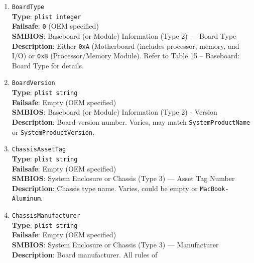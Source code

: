 \documentclass[]{article}
\begin{document}
\begin{enumerate}
  \texttt{BoardSerialNumber}\\
  \textbf{Type}: \texttt{plist\ string}\\
  \textbf{Failsafe}: Empty (OEM specified)\\
  \textbf{SMBIOS}: Baseboard (or Module) Information (Type 2) --- Serial
  Number\\
  \textbf{Description}: Board serial number in defined format. Known
  formats are described in
  \href{https://github.com/acidanthera/macserial/blob/master/FORMAT.md}{macserial}.
\item
  \texttt{BoardType}\\
  \textbf{Type}: \texttt{plist\ integer}\\
  \textbf{Failsafe}: \texttt{0} (OEM specified)\\
  \textbf{SMBIOS}: Baseboard (or Module) Information (Type 2) --- Board
  Type\\
  \textbf{Description}: Either \texttt{0xA} (Motherboard (includes
  processor, memory, and I/O) or \texttt{0xB} (Processor/Memory Module).
  Refer to Table 15 -- Baseboard: Board Type for details.
\item
  \texttt{BoardVersion}\\
  \textbf{Type}: \texttt{plist\ string}\\
  \textbf{Failsafe}: Empty (OEM specified)\\
  \textbf{SMBIOS}: Baseboard (or Module) Information (Type 2) -
  Version\\
  \textbf{Description}: Board version number. Varies, may match
  \texttt{SystemProductName} or \texttt{SystemProductVersion}.
\item
  \texttt{ChassisAssetTag}\\
  \textbf{Type}: \texttt{plist\ string}\\
  \textbf{Failsafe}: Empty (OEM specified)\\
  \textbf{SMBIOS}: System Enclosure or Chassis (Type 3) --- Asset Tag
  Number\\
  \textbf{Description}: Chassis type name. Varies, could be empty or
  \texttt{MacBook-Aluminum}.
\item
  \texttt{ChassisManufacturer}\\
  \textbf{Type}: \texttt{plist\ string}\\
  \textbf{Failsafe}: Empty (OEM specified)\\
  \textbf{SMBIOS}: System Enclosure or Chassis (Type 3) --- Manufacturer\\
  \textbf{Description}: Board manufacturer. All rules of

\end{enumerate}
\end{document}
